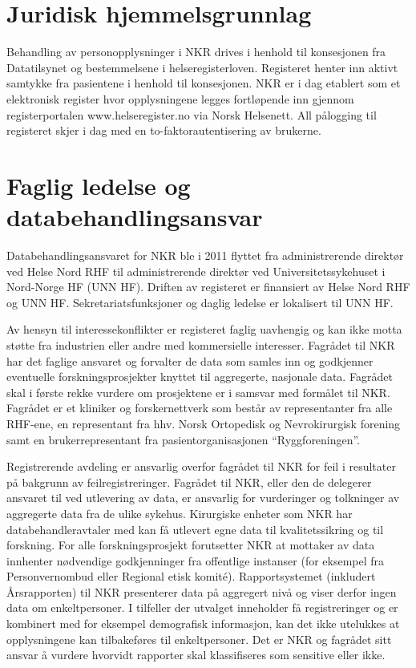 \documentclass[norsk, a4paper, twocolumn]{report}
\begin{document}
\section{Juridisk hjemmelsgrunnlag}\label{cha:jur}
Behandling av personopplysninger i NKR drives i henhold til konsesjonen fra Datatilsynet og bestemmelsene i helseregisterloven.  Registeret henter inn aktivt samtykke fra pasientene i henhold til konsesjonen.
NKR er i dag etablert som et elektronisk register hvor opplysningene legges fortløpende inn gjennom registerportalen www.helseregister.no via Norsk Helsenett. All pålogging til registeret skjer i dag med en to-faktorautentisering av brukerne. 



\section{Faglig ledelse og databehandlingsansvar}\label{cha:led}
Databehandlingsansvaret for NKR ble i 2011 flyttet fra administrerende direktør ved Helse Nord RHF til administrerende direktør ved Universitetssykehuset i Nord-Norge HF (UNN HF). Driften av registeret er finansiert av Helse Nord RHF og UNN HF. Sekretariatsfunksjoner og daglig ledelse er lokalisert til UNN HF.

Av hensyn til interessekonflikter er registeret faglig uavhengig og kan ikke motta støtte fra industrien eller andre med kommersielle interesser. Fagrådet til NKR har det faglige ansvaret og forvalter de data som samles inn og godkjenner eventuelle forskningsprosjekter knyttet til aggregerte, nasjonale data. Fagrådet skal i første rekke vurdere om prosjektene er i samsvar med formålet til NKR. Fagrådet er et kliniker og forskernettverk som består av representanter fra alle RHF-ene, en representant fra hhv. Norsk Ortopedisk og Nevrokirurgisk forening samt en brukerrepresentant fra pasientorganisasjonen ``Ryggforeningen''.

Registrerende avdeling er ansvarlig overfor fagrådet til NKR for feil i resultater på bakgrunn av feilregistreringer. Fagrådet til NKR, eller den de delegerer ansvaret til ved utlevering av data, er ansvarlig for vurderinger og tolkninger av aggregerte data fra de ulike sykehus. Kirurgiske enheter som NKR har databehandleravtaler med kan få utlevert egne data til kvalitetssikring og til forskning. For alle forskningsprosjekt forutsetter NKR at mottaker av data innhenter nødvendige godkjenninger fra offentlige instanser (for eksempel fra Personvernombud eller Regional etisk komité). Rapportsystemet (inkludert Årsrapporten) til NKR presenterer data på aggregert nivå og viser derfor ingen data om enkeltpersoner. I tilfeller der utvalget inneholder få registreringer og er kombinert med for eksempel demografisk informasjon, kan det ikke utelukkes at opplysningene kan tilbakeføres til enkeltpersoner. Det er NKR og fagrådet sitt ansvar å vurdere hvorvidt rapporter skal klassifiseres som sensitive eller ikke. 
\end{document}
